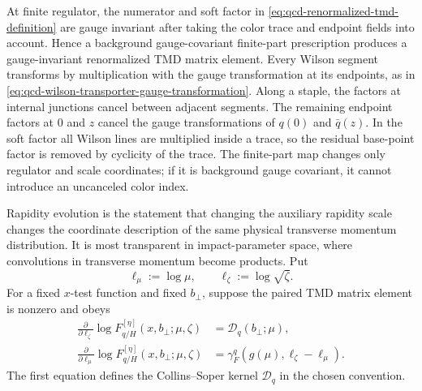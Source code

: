 At finite regulator, the numerator and soft factor in
\eqref{eq:qcd-renormalized-tmd-definition} are gauge invariant after taking
the color trace and endpoint fields into account.  Hence a background
gauge-covariant finite-part prescription produces a gauge-invariant
renormalized TMD matrix element.
Every Wilson segment transforms by multiplication with the gauge
transformation at its endpoints, as in
\eqref{eq:qcd-wilson-transporter-gauge-transformation}.  Along a staple, the
factors at internal junctions cancel between adjacent segments.  The remaining
endpoint factors at \(0\) and \(z\) cancel the gauge transformations of
\(q(0)\) and \(\bar q(z)\).  In the soft factor all Wilson lines are multiplied
inside a trace, so the residual base-point factor is removed by cyclicity of
the trace.  The finite-part map changes only regulator and scale coordinates;
if it is background gauge covariant, it cannot introduce an uncanceled color
index.

Rapidity evolution is the statement that changing the auxiliary rapidity
scale changes the coordinate description of the same physical transverse
momentum distribution.  It is most transparent in impact-parameter space,
where convolutions in transverse momentum become products.  Put
\[
  \ell_\mu:=\log\mu,
  \qquad
  \ell_\zeta:=\log\sqrt{\zeta}.
\]
For a fixed \(x\)-test function and fixed \(b_\perp\), suppose the paired TMD
matrix element is nonzero and obeys
\begin{align}
  \frac{\partial}{\partial\ell_\zeta}
  \log F_{q/H}^{[\eta]}(x,b_\perp;\mu,\zeta)
  &=
  \mathcal D_q(b_\perp;\mu),
  \label{eq:qcd-collins-soper-equation}\\
  \frac{\partial}{\partial\ell_\mu}
  \log F_{q/H}^{[\eta]}(x,b_\perp;\mu,\zeta)
  &=
  \gamma_F^q(g(\mu),\ell_\zeta-\ell_\mu).
  \label{eq:qcd-tmd-mu-evolution}
\end{align}
The first equation defines the Collins--Soper kernel
\(\mathcal D_q\) in the chosen convention.

